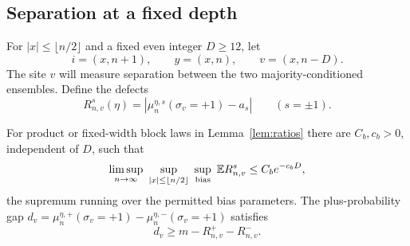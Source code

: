 \subsection{Separation at a fixed depth}
For $|x|\le\lfloor n/2\rfloor$ and a fixed even integer $D\ge12$, let
\[
 i=(x,n+1),\qquad y=(x,n),\qquad v=(x,n-D).
\]
The site $v$ will measure separation between the two majority-conditioned ensembles. Define the defects
\[
 R_{n,v}^s(\eta)=\left|\mu_n^{\eta,s}(\sigma_v=+1)-a_s\right|\qquad(s=\pm1).
\]

\begin{lemma}\label{lem:tooth}
For product or fixed-width block laws in Lemma~\ref{lem:ratios} there are $C_b,c_b>0$, independent of $D$, such that
\begin{equation}\label{eq:rem}
 \limsup_{n\to\infty}\ \sup_{|x|\le\lfloor n/2\rfloor}\ \sup_{\text{bias}}\ \E R_{n,v}^s\le C_b e^{-c_bD},
\end{equation}
the supremum running over the permitted bias parameters. The plus-probability gap $d_v=\mu_n^{\eta,+}(\sigma_v=+1)-\mu_n^{\eta,-}(\sigma_v=+1)$ satisfies
\begin{equation}\label{eq:gap}
 d_v\ge m-R_{n,v}^+-R_{n,v}^-.
\end{equation}
\end{lemma}
